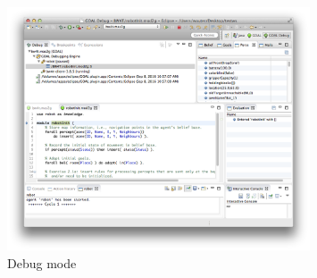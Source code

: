 \documentclass[11pt,a4paper]{article}
\begin{document}
\begin{figure}[!h]
  \begin{center}
    \includegraphics[width=0.8\textwidth]{debugmode.png}
    \caption{Debug mode}\label{fig:Eclipse}
  \end{center}
\end{figure}
\end{document}
